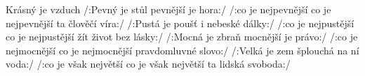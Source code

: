 \begin{TEXT}{Krásný je vzduch}
\SLOKA \hspace{0em} \hspace*{0.75\textwidth} \NL
\hspace{0em} \hspace*{0.75\textwidth}\NL
\hspace{0em} \hspace*{0.75\textwidth}
\SLOKA /:Pevný je stůl pevnější je hora:/ \NL
/:co je nejpevnější co je nejpevnější \NL
ta člověčí víra:/ 
\SLOKA /:Pustá je poušť i nebeské dálky:/ \NL
/:co je nejpustější co je nejpustější \NL
žít život bez lásky:/ 
\SLOKA /:Mocná je zbraň mocnější je právo:/ \NL
/:co je nejmocnější co je nejmocnější \NL
pravdomluvné slovo:/ 
\SLOKA /:Velká je zem šplouchá na ní voda:/ \NL
/:co je však největší co je však největší \NL
ta lidská svoboda:/ \NL
\end{TEXT}
